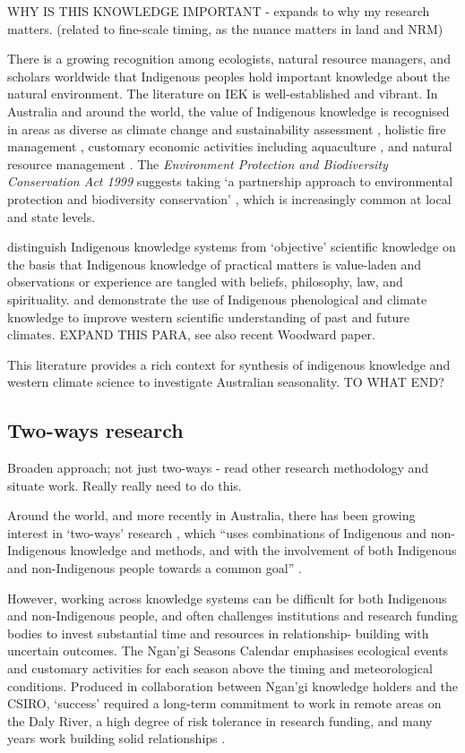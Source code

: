 WHY IS THIS KNOWLEDGE IMPORTANT - expands to why my research matters.
(related to fine-scale timing, as the nuance matters in land and NRM)

There is a growing recognition among ecologists, natural resource managers, and
scholars worldwide that Indigenous peoples hold important knowledge about the
natural environment. The literature on IEK is well-established and vibrant.  In
Australia and around the world, the value of Indigenous knowledge is recognised
in areas as diverse as climate change and sustainability assessment
\citep[eg.][]{cochran2015}, holistic fire management \citep[eg.][]{clarke2009,price2012},
customary economic activities including aquaculture \citep{woodward2012a}, and
natural resource management \citep[eg.][]{prober2011}.  The \textit{Environment
Protection and Biodiversity Conservation Act 1999} suggests taking `a
partnership approach to environmental protection and biodiversity conservation'
\citep{ens2012}, which is increasingly common at local and state levels.

\citet{turner2009} distinguish Indigenous knowledge systems from `objective'
scientific knowledge on the basis that Indigenous knowledge of practical
matters is value-laden and observations or experience are tangled with beliefs,
philosophy, law, and spirituality.  \citet{green2010a} and \citet{clarke2009}
demonstrate the use of Indigenous phenological and climate knowledge to improve
western scientific understanding of past and future climates.
EXPAND THIS PARA, see also recent Woodward paper.

This literature provides a rich context for synthesis of indigenous knowledge
and western climate science to investigate Australian seasonality.
TO WHAT END?



\subsection{Two-ways research}
Broaden approach; not just two-ways - read other research methodology and
situate work.  Really really need to do this.

Around the world, and more recently in Australia, there has been growing
interest in `two-ways' research \citep{turner2009,prober2011},
which ``uses combinations of Indigenous and non-Indigenous knowledge and
methods, and with the involvement of both Indigenous and non-Indigenous people
towards a common goal'' \citep{ens2014}.

However, working across knowledge systems can be difficult for both Indigenous
and non-Indigenous people, and often challenges institutions and research
funding bodies to invest substantial time and resources in relationship-
building with uncertain outcomes.  The Ngan'gi Seasons Calendar emphasises
ecological events and customary activities for each season above the timing and
meteorological conditions.  Produced in collaboration between Ngan'gi knowledge
holders and the CSIRO, `success' required a long-term commitment to work in
remote areas on the Daly River, a high degree of risk tolerance in
research funding, and many years work building solid relationships \citep{woodward2010}.

